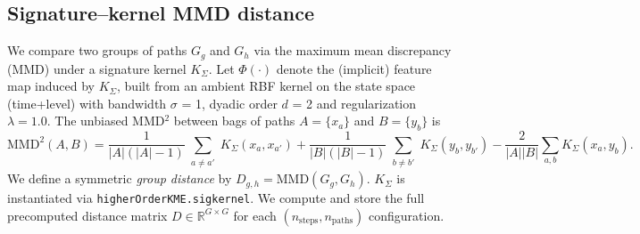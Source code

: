 \subsection{Signature–kernel MMD distance}\label{sec:regime:mmd}
We compare two groups of paths $G_g$ and $G_h$ via the maximum mean discrepancy (MMD) under a signature kernel $K_\Sigma$.
Let $\Phi(\cdot)$ denote the (implicit) feature map induced by $K_\Sigma$, built from an ambient RBF kernel on the state space (time+level) with bandwidth $\sigma$ = 1, dyadic order $d$ = 2 and regularization \(\lambda=1.0\).
The unbiased MMD$^2$ between bags of paths $A=\{x_a\}$ and $B=\{y_b\}$ is
\[
\mathrm{MMD}^2(A,B)
= \frac{1}{|A|(|A|-1)}\!\!\sum_{\substack{a\neq a'}}\! K_\Sigma(x_a,x_{a'})
+ \frac{1}{|B|(|B|-1)}\!\!\sum_{\substack{b\neq b'}}\! K_\Sigma(y_b,y_{b'})
- \frac{2}{|A||B|}\sum_{a,b} K_\Sigma(x_a,y_b).
\]
We define a symmetric \emph{group distance} by
\(
D_{g,h}=\mathrm{MMD}(G_g,G_h).
\)
$K_\Sigma$ is instantiated via \texttt{higherOrderKME.sigkernel}.
We compute and store the full precomputed distance matrix $D\in\mathbb{R}^{G\times G}$ for each $(n_{\text{steps}},n_{\text{paths}})$ configuration.


